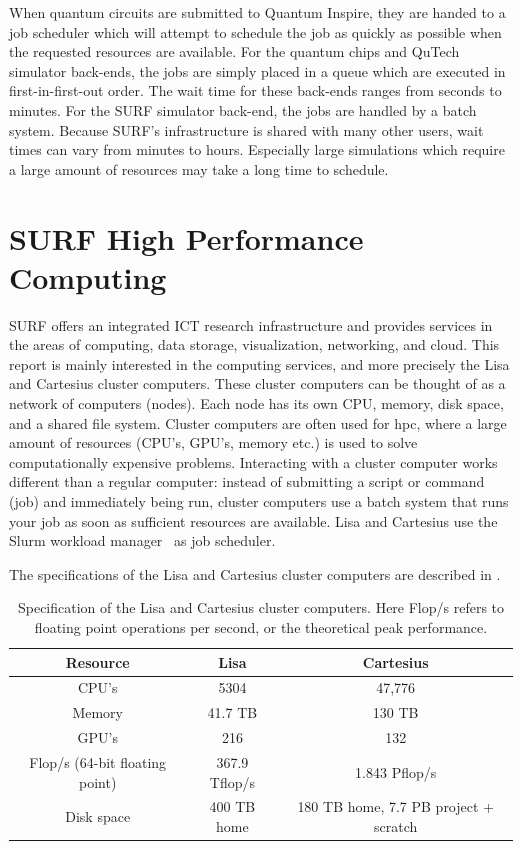 When quantum circuits are submitted to Quantum Inspire, they are handed to a job scheduler which will attempt to schedule the job as quickly as possible when the requested resources are available.
For the quantum chips and QuTech simulator back-ends, the jobs are simply placed in a queue which are executed in first-in-first-out order.
The wait time for these back-ends ranges from seconds to minutes.
For the SURF simulator back-end, the jobs are handled by a batch system.
Because SURF's infrastructure is shared with many other users, wait times can vary from minutes to hours.
Especially large simulations which require a large amount of resources may take a long time to schedule.

\section{SURF High Performance Computing}
SURF offers an integrated ICT research infrastructure and provides services in the areas of computing, data storage, visualization, networking, and cloud.
This report is mainly interested in the computing services, and more precisely the Lisa and Cartesius cluster computers.
These cluster computers can be thought of as a network of computers (nodes).
Each node has its own CPU, memory, disk space, and a shared file system.
Cluster computers are often used for \acrfull{hpc}, where a large amount of resources (CPU's, GPU's, memory etc.) is used to solve computationally expensive problems.
Interacting with a cluster computer works different than a regular computer: instead of submitting a script or command (job) and immediately being run, cluster computers use a batch system that runs your job as soon as sufficient resources are available.
Lisa and Cartesius use the Slurm workload manager~\cite{yoo2003slurm} as job scheduler.

The specifications of the Lisa and Cartesius cluster computers are described in .

\begin{table}[ht]
    \centering
    \begin{tabular}{ c|c|c }
        Resource & Lisa & Cartesius \\
        \hline
        CPU's & 5304 & 47,776   \\
        Memory & 41.7 TB & 130 TB \\
        GPU's & 216 & 132 \\
        Flop/s (64-bit floating point) & 367.9 Tflop/s & 1.843 Pflop/s  \\
        Disk space & 400 TB home & 180 TB home, 7.7 PB project + scratch \\
    \end{tabular}
    \caption[Specification of the Lisa and Cartesius cluster computers.]{
        Specification of the Lisa and Cartesius cluster computers.
        Here Flop/s refers to floating point operations per second, or the theoretical peak performance.
    }
    \label{table:surf-cluster-computers}
\end{table}

